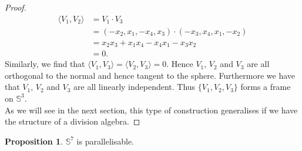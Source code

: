 \documentclass[12pt,a4paper]{article}
\numberwithin{equation}{section}
\theoremstyle{definition}
\newtheorem{proposition}{Proposition}[section]
\theoremstyle{remark}
\begin{document}
\begin{proof}
\begin{align*}
\langle V_1,V_2\rangle &=V_1\cdot V_3\\
&=(-x_2,x_1,-x_4,x_3)\cdot (-x_3,x_4,x_1,-x_2)\\
&=x_2x_3+x_1x_4-x_4x_1-x_3x_2\\
&=0.
\end{align*}
Similarly, we find that $\langle V_1,V_3\rangle=\langle V_2,V_3\rangle=0$. Hence $V_1$, $V_2$ and $V_3$ are all orthogonal to the normal and hence tangent to the sphere. Furthermore we have that $V_1$, $V_2$ and $V_3$ are all linearly independent. Thus $\{V_1,V_2,V_3\}$ forms a frame on $\mathbb{S}^3$.\\

As we will see in the next section, this type of construction generalises if we have the structure of a division algebra.
\end{proof}
\begin{proposition}
$\mathbb{S}^7$ is parallelisable.
\end{proposition}
\end{document}
